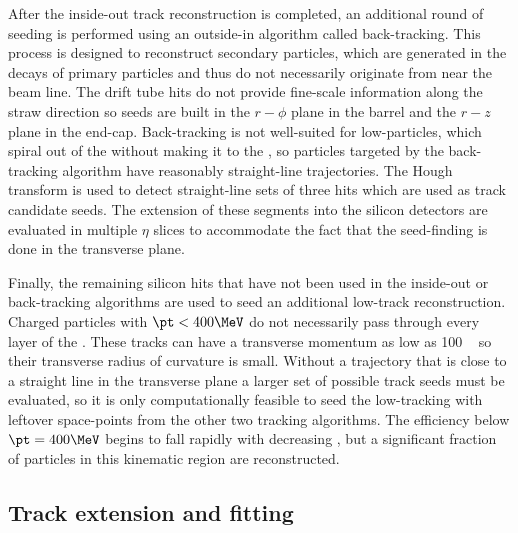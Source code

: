 After the inside-out track reconstruction is completed, an additional round of seeding is performed using an outside-in algorithm called back-tracking.
This process is designed to reconstruct secondary particles, which are generated in the decays of primary particles and thus do not necessarily originate from near the beam line.
The \trt drift tube hits do not provide fine-scale information along the straw direction so seeds are built in the $r - \phi$ plane in the \trt barrel and the $r - z$ plane in the \trt end-cap.
Back-tracking is not well-suited for low-\pt particles, which spiral out of the \id without making it to the \trt, so particles targeted by the back-tracking algorithm have reasonably straight-line trajectories.
The Hough transform \cite{Duda:1972:UHT:361237.361242} is used to detect straight-line sets of three \trt hits which are used as track candidate seeds.
The extension of these \trt segments into the silicon detectors are evaluated in multiple $\eta$ slices to accommodate the fact that the seed-finding is done in the transverse plane.

Finally, the remaining silicon hits that have not been used in the inside-out or back-tracking algorithms are used to seed an additional low-\pt track reconstruction.
Charged particles with $\pt < 400 \MeV$ do not necessarily pass through every layer of the \sct.
These tracks can have a transverse momentum as low as 100 \MeV~ so their transverse radius of curvature is small.
Without a trajectory that is close to a straight line in the transverse plane a larger set of possible track seeds must be evaluated, so it is only computationally feasible to seed the low-\pt tracking with leftover space-points from the other two tracking algorithms.
The efficiency below $\pt = 400 \MeV$ begins to fall rapidly with decreasing \pt, but a significant fraction of particles in this kinematic region are reconstructed.

\subsection{Track extension and fitting}

